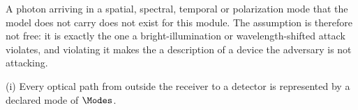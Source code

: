
A photon arriving in a spatial, spectral, temporal or polarization mode that
the model does not carry does not exist for this module. The assumption is
therefore not free: it is exactly the one a bright-illumination or
wavelength-shifted attack violates, and violating it makes the  a
description of a device the adversary is not attacking.

\begin{assumption}\label{ass:modes}
(i) Every optical path from outside the receiver to a detector is represented
by a declared mode of $\Modes$.
\end{assumption}
